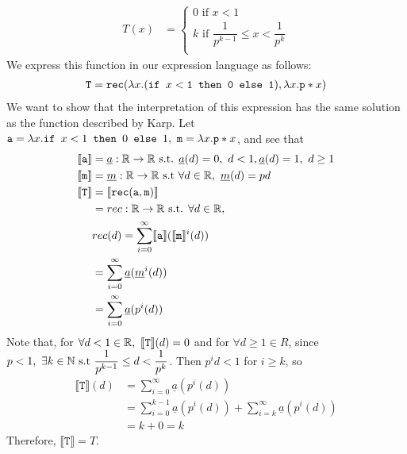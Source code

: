 \begin{align*}
T(x) &= 
 \begin{cases}
 0 \text{ if } x < 1 \\
 k \text{ if }  \dfrac{1}{p^{k-1}} \leq x < \dfrac{1}{p^k} \\
 \end{cases}
 \end{align*}
 We express this function in our expression language as follows: 
 \begin{align*}
 \texttt{T} = \texttt{rec}(\lambda x.(\texttt{if } x<\texttt{1} \texttt{ then } \texttt{0} \texttt{ else } \texttt{1}), \lambda x. \texttt{p}*x)
 \end{align*}
 We want to show that the interpretation of this expression has the same solution as the function described by Karp.
 Let $\texttt{a} = \lambda x.\texttt{if } x<1 \texttt{ then } 0 \texttt{ else } 1, \ \texttt{m} = \lambda x.\texttt{p}*x$, and see that
 \begin{align*}
  \llbracket \texttt{a} \rrbracket &= \underline{a} : \mathbb{R} \rightarrow \mathbb{R} \text{ s.t. } \underline{a}(d) = 0, 
  \ d<1, \underline{a}(d) = 1, \ d \geq 1  \\
 \llbracket \texttt{m} \rrbracket &= \underline{m} : \mathbb{R} \rightarrow \mathbb{R} \text{ s.t } \forall d \in \mathbb{R}, \
 \underline{m}(d) = pd \\
 \llbracket \texttt{T} \rrbracket&= \llbracket \texttt{rec}(\texttt{a}, \texttt{m}) \rrbracket \\
 &= rec: \mathbb{R} \rightarrow \mathbb{R} \text{ s.t. } \forall d \in \mathbb{R}, \\
 &rec(d) = \sum_{i=0}^{\infty}\llbracket \texttt{a} \rrbracket (\llbracket \texttt{m} \rrbracket^i(d)) \\
 &= \sum_{i=0}^{\infty}\underline{a} (\underline{m}^i(d)) \\
 &= \sum_{i=0}^{\infty}\underline{a} (p^i(d))
 \end{align*}
Note that, for $\forall d<1 \in \mathbb{R}, \ \llbracket \texttt{T} \rrbracket(d) = 0$
and for $\forall d \geq 1 \in R$, since $p < 1, \ \exists k \in \mathbb{N} \text{ s.t } \dfrac{1}{p^{k-1}} \leq d < \dfrac{1}{p^k}$. Then
$p^id < 1$ for $i \geq k$, so
\begin{align*}
\llbracket \texttt{T} \rrbracket(d)&= \sum_{i=0}^{\infty}\underline{a} (p^i(d)) \\
&= \sum_{i=0}^{k-1}\underline{a} (p^i(d)) + \sum_{i=k}^{\infty}\underline{a} (p^i(d)) \\
&= k + 0 = k
\end{align*}
Therefore, $\llbracket \texttt{T} \rrbracket = T$.
 

